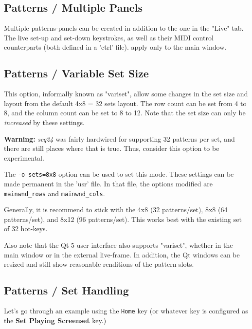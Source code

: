 \subsection{Patterns / Multiple Panels}
\label{subsec:patterns_panel_multiple}

   Multiple patterns-panels can be created in addition to the one in the "Live"
   tab.  The live set-up and set-down keystrokes, as well as their MIDI control
   counterparts (both defined in a 'ctrl' file).
   apply only to the main window.

\subsection{Patterns / Variable Set Size}
\label{subsec:patterns_panel_variset}

   This option, informally known as "variset", allow some changes in
   the set size and layout from the default 4x8 = 32 sets layout.
   The row count can be set from 4 to 8, and the column count can be set to 8
   to 12.  Note that the set size can only be \textsl{increased} by these
   settings.

   \textbf{Warning:}
   \textsl{seq24} was fairly hardwired for supporting 32 patterns per
   set, and there are still places where that is true.  Thus,
   consider this option to be experimental.

   The \texttt{-o sets=8x8} option can be used to set this mode.
   These settings can be made permanent in the 'usr' file.
   In that file, the options modified are \texttt{mainwnd\_rows} and
   \texttt{mainwnd\_cols}.

   Generally, it is recommend to stick with the 4x8 (32 patterns/set),
   8x8 (64 patterns/set), and 8x12 (96 patterns/set).  This works best with the
   existing set of 32 hot-keys.

   Also note that the Qt 5 user-interface also supports "variset", whether in
   the main window or in the external live-frame.  In addition, the Qt windows
   can be resized and still show reasonable renditions of the pattern-slots.

\subsection{Patterns / Set Handling}
\label{subsec:patterns_panel_set_handling}

   Let's go through an example using the \texttt{Home} key (or whatever key is
   configured as the \textbf{Set Playing Screenset} key.)

